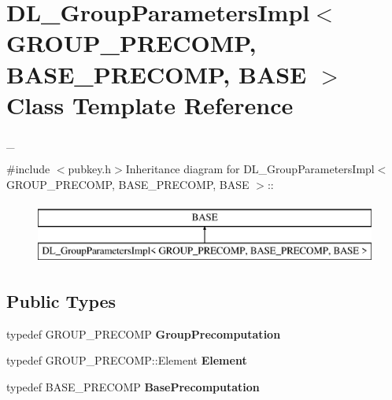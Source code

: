 \hypertarget{class_d_l___group_parameters_impl}{
\section{DL\_\-GroupParametersImpl$<$ GROUP\_\-PRECOMP, BASE\_\-PRECOMP, BASE $>$ Class Template Reference}
\label{class_d_l___group_parameters_impl}
}


\_\-  


{\ttfamily \#include $<$pubkey.h$>$}Inheritance diagram for DL\_\-GroupParametersImpl$<$ GROUP\_\-PRECOMP, BASE\_\-PRECOMP, BASE $>$::\begin{figure}[H]
\begin{center}
\leavevmode
\includegraphics[height=2cm]{class_d_l___group_parameters_impl}
\end{center}
\end{figure}
\subsection*{Public Types}
\begin{DoxyCompactItemize}
\item 
\hypertarget{class_d_l___group_parameters_impl_acb47af3b21275ad8570601888c903e29}{
typedef GROUP\_\-PRECOMP {\bfseries GroupPrecomputation}}
\label{class_d_l___group_parameters_impl_acb47af3b21275ad8570601888c903e29}

\item 
\hypertarget{class_d_l___group_parameters_impl_af7edcf0b8021decccd2d992b962a7105}{
typedef GROUP\_\-PRECOMP::Element {\bfseries Element}}
\label{class_d_l___group_parameters_impl_af7edcf0b8021decccd2d992b962a7105}

\item 
\hypertarget{class_d_l___group_parameters_impl_adf098dcc0eb88b0c408ac6762d54a5d9}{
typedef BASE\_\-PRECOMP {\bfseries BasePrecomputation}}
\label{class_d_l___group_parameters_impl_adf098dcc0eb88b0c408ac6762d54a5d9}

\end{DoxyCompactItemize}

